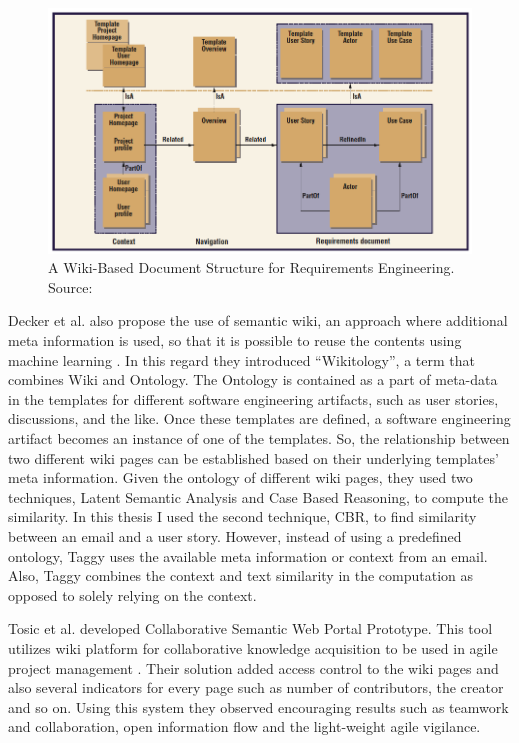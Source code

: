 \begin{figure}[bt]
	\centering
	\includegraphics[width=\textwidth]{Wiki.png}
    \caption{A Wiki-Based Document Structure for Requirements Engineering. Source: \cite{wiki_based}}
	\label{fig:wiki}
\end{figure}

Decker et al. also propose the use of semantic wiki, an approach where additional meta information is used, so that it is possible to reuse the contents using machine learning \cite{self_organized}. In this regard they introduced ``Wikitology'', a term that combines Wiki and Ontology. The Ontology is contained as a part of meta-data in the templates for different software engineering artifacts, such as user stories, discussions, and the like. Once these templates are defined, a software engineering artifact becomes an instance of one of the templates. So, the relationship between two different wiki pages can be established based on their underlying templates' meta information. Given the ontology of different wiki pages, they used two techniques, Latent Semantic Analysis and Case Based Reasoning, to compute the similarity. In this thesis I used the second technique, CBR, to find similarity between an email and a user story. However, instead of using a predefined ontology, Taggy uses the available meta information or context from an email. Also, Taggy combines the context and text similarity in the computation as opposed to solely relying on the context.

Tosic et al. developed Collaborative Semantic Web Portal Prototype. This tool utilizes wiki platform for collaborative knowledge acquisition to be used in agile project management \cite{collaborative_knowledge}. Their solution added access control to the wiki pages and also several indicators for every page such as number of contributors, the creator and so on. Using this system they observed encouraging results such as teamwork and collaboration, open information flow and the light-weight agile vigilance. 

